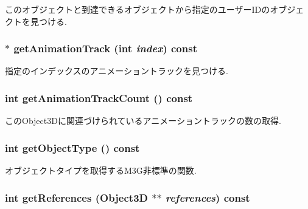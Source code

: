 このオブジェクトと到達できるオブジェクトから指定のユーザーIDのオブジェクトを見つける. \hypertarget{classm3g_1_1Object3D_f0978f3f2efe3227ca613da3361424dd}{
\subsubsection[{getAnimationTrack}]{ $\ast$ getAnimationTrack (int {\em index}) const}}
\label{classm3g_1_1Object3D_f0978f3f2efe3227ca613da3361424dd}


指定のインデックスのアニメーショントラックを見つける. \hypertarget{classm3g_1_1Object3D_0926843b66090795972850376b8e4e6c}{
\subsubsection[{getAnimationTrackCount}]{\setlength{\rightskip}{0pt plus 5cm}int getAnimationTrackCount () const}}
\label{classm3g_1_1Object3D_0926843b66090795972850376b8e4e6c}


このObject3Dに関連づけられているアニメーショントラックの数の取得. \hypertarget{classm3g_1_1Object3D_06be1b37b707b5f227cba2308043f3df}{
\subsubsection[{getObjectType}]{\setlength{\rightskip}{0pt plus 5cm}int getObjectType () const}}
\label{classm3g_1_1Object3D_06be1b37b707b5f227cba2308043f3df}


オブジェクトタイプを取得するM3G非標準の関数. \hypertarget{classm3g_1_1Object3D_d52d3c63076c4341b34c3631a17820e4}{
\subsubsection[{getReferences}]{\setlength{\rightskip}{0pt plus 5cm}int getReferences ({\bf Object3D} $\ast$$\ast$ {\em references}) const}}
\label{classm3g_1_1Object3D_d52d3c63076c4341b34c3631a17820e4}


